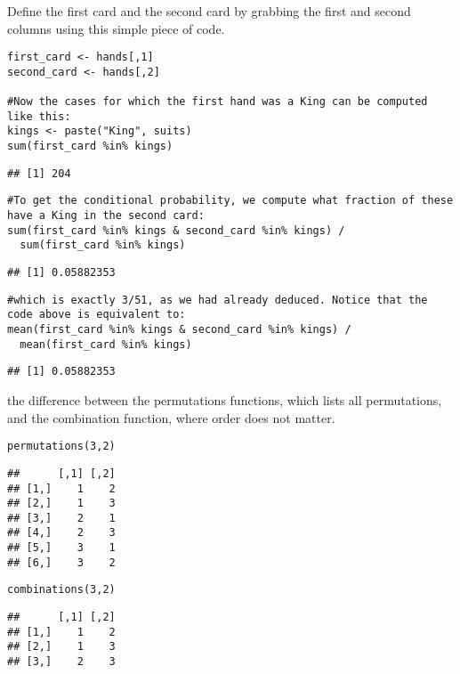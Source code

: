 \documentclass[
]{article}
\begin{document}
Define the first card and the second card by grabbing the first and
second columns using this simple piece of code.

\begin{verbatim}
first_card <- hands[,1]
second_card <- hands[,2]

#Now the cases for which the first hand was a King can be computed like this:
kings <- paste("King", suits)
sum(first_card %in% kings)
\end{verbatim}

\begin{verbatim}
## [1] 204
\end{verbatim}

\begin{verbatim}
#To get the conditional probability, we compute what fraction of these have a King in the second card:
sum(first_card %in% kings & second_card %in% kings) /
  sum(first_card %in% kings)
\end{verbatim}

\begin{verbatim}
## [1] 0.05882353
\end{verbatim}

\begin{verbatim}
#which is exactly 3/51, as we had already deduced. Notice that the code above is equivalent to:
mean(first_card %in% kings & second_card %in% kings) /
  mean(first_card %in% kings)
\end{verbatim}

\begin{verbatim}
## [1] 0.05882353
\end{verbatim}

the difference between the permutations functions, which lists all
permutations, and the combination function, where order does not matter.

\begin{verbatim}
permutations(3,2)
\end{verbatim}

\begin{verbatim}
##      [,1] [,2]
## [1,]    1    2
## [2,]    1    3
## [3,]    2    1
## [4,]    2    3
## [5,]    3    1
## [6,]    3    2
\end{verbatim}

\begin{verbatim}
combinations(3,2)
\end{verbatim}

\begin{verbatim}
##      [,1] [,2]
## [1,]    1    2
## [2,]    1    3
## [3,]    2    3
\end{verbatim}
\end{document}
